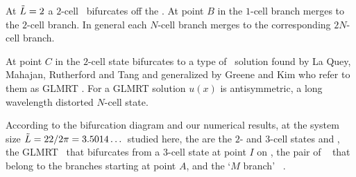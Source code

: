 At $\tilde{L}=2$ a $2$-cell \eqv\ bifurcates off the  \eqv.
At point $B$ in  the $1$-cell branch merges
to the $2$-cell branch.  In general each $N$-cell branch merges
to the corresponding $2N$-cell branch.

At point $C$ in 
the $2$-cell state bifurcates to a type of \eqv\ solution
found by La Quey, Mahajan, Rutherford and Tang
and generalized by Greene and Kim who refer to them as GLMRT \eqva.
For a GLMRT solution $u(x)$ is antisymmetric,
a long wavelength distorted $N$-cell state.


According to the bifurcation diagram
and our numerical results,
at the system size $\tilde{L}=22/2\pi = 3.5014\dots$ studied here,
the {\eqva} are the $2$- and $3$-cell states  and ,
the GLMRT \eqv\ that bifurcates from a $3$-cell state at point $I$
on ,
the pair of \reqva\  
that belong to the branches starting at point
$A$,
and the `$M$ branch'  \reqva\ .

